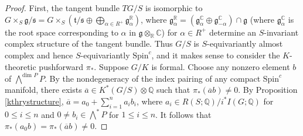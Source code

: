 \documentclass[11pt]{amsart}
\theoremstyle{plain}
\theoremstyle{definition}
\begin{document}
	\begin{proof}
		First, the tangent bundle $TG/S$ is isomorphic to $G\times_S\mathfrak{g}/\mathfrak{s}=G\times_S\left(\mathfrak{t}/\mathfrak{s}\oplus\bigoplus_{\alpha\in R^+}\mathfrak{g}_\alpha^{\mathbb{R}}\right)$, where $\mathfrak{g}_\alpha^{\mathbb{R}}=\left(\mathfrak{g}_\alpha^\mathbb{C}\oplus\mathfrak{g}_{-\alpha}^\mathbb{C}\right)\cap \mathfrak{g}$ (where $\mathfrak{g}_\alpha^\mathbb{C}$ is the root space corresponding to $\alpha$ in $\mathfrak{g}\otimes_\mathbb{R}\mathbb{C}$) for $\alpha\in R^+$ determine an $S$-invariant complex structure of the tangent bundle. Thus $G/S$ is $S$-equivariantly almost complex and hence $S$-equivariantly $\text{Spin}^c$, and it makes sense to consider the $K$-theoretic pushforward $\pi_*$. Suppose $G/K$ is formal. Choose any nonzero element $b$ of $\bigwedge\nolimits^{\text{dim }P}P$. By the nondegeneracy of the index pairing of any compact $\text{Spin}^c$ manifold, there exists $\overline{a}\in K^*(G/S)\otimes\mathbb{Q}$ such that $\pi_*(\overline{a}b)\neq 0$. By Proposition \ref{kthrystructure}, $\overline{a}=a_0+\sum_{i=1}^n a_ib_i$, where $a_i\in R(S; \mathbb{Q})/i^*I(G; \mathbb{Q})$ for $0\leq i\leq n$ and $0\neq b_i\in \bigwedge\nolimits^*P$ for $1\leq i\leq n$. It follows that $\pi_*(a_0b)=\pi_*(\overline{a}b)\neq 0$.
		

\end{proof}
\end{document}
